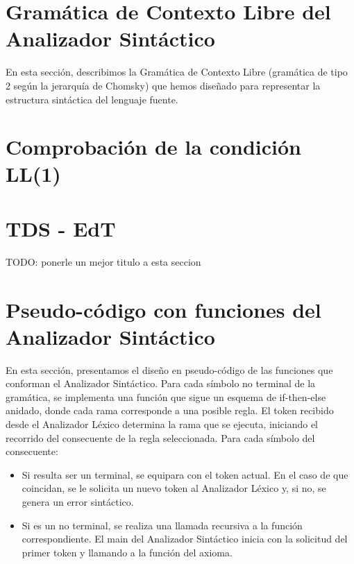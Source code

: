 \documentclass{article}
\begin{document}
\newpage

\section{Gramática de Contexto Libre del Analizador Sintáctico}

En esta sección, describimos la Gramática de Contexto Libre (gramática de tipo 2 según la jerarquía de Chomsky) que hemos diseñado para representar la estructura sintáctica del lenguaje fuente.



\newpage

\section{Comprobación de la condición LL(1)}



\section{TDS - EdT}
TODO: ponerle un mejor titulo a esta seccion


\section{Pseudo-código con funciones del Analizador Sintáctico}

En esta sección, presentamos el diseño en pseudo-código de las funciones que conforman el Analizador Sintáctico. Para cada símbolo no terminal de la gramática, se implementa una función que sigue un esquema de if-then-else anidado, donde cada rama corresponde a una posible regla. El token recibido desde el Analizador Léxico determina la rama que se ejecuta, iniciando el recorrido del consecuente de la regla seleccionada. Para cada símbolo del consecuente:

\begin{itemize}
    \item Si resulta ser un terminal, se equipara con el token actual. En el caso de que coincidan, se le solicita un nuevo token al Analizador Léxico y, si no, se genera un error sintáctico. 
    \item Si es un no terminal, se realiza una llamada recursiva a la función correspondiente. El main del Analizador Sintáctico inicia con la solicitud del primer token y llamando a la función del axioma. 
\end{itemize}
\end{document}
